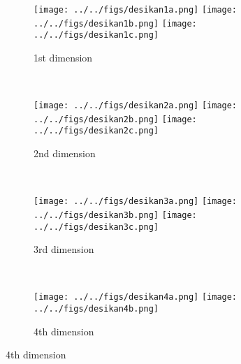 \documentclass[simplex.tex]{subfiles}
\begin{document}
\begin{figure}	
\centering
\begin{subfigure}[t]{0.6\textwidth}
\caption{1st dimension}
\vspace*{-15pt}
\begin{center}
  \texttt{[image: ../../figs/desikan1a.png]}\hspace{-20pt}
  \texttt{[image: ../../figs/desikan1b.png]}\hspace{-20pt}
  \texttt{[image: ../../figs/desikan1c.png]}
\end{center}
\end{subfigure}\\
\vspace*{5pt}
\begin{subfigure}[t]{0.6\textwidth}
\caption{2nd dimension}
\vspace*{-15pt}
\begin{center}
  \texttt{[image: ../../figs/desikan2a.png]}\hspace{-20pt}
  \texttt{[image: ../../figs/desikan2b.png]}\hspace{-20pt}
  \texttt{[image: ../../figs/desikan2c.png]}
\end{center}
\end{subfigure}\\
\vspace*{5pt}
\begin{subfigure}[t]{0.6\textwidth}
\caption{3rd dimension}
\vspace*{-15pt}
\begin{center}
  \texttt{[image: ../../figs/desikan3a.png]}\hspace{-20pt}
  \texttt{[image: ../../figs/desikan3b.png]}\hspace{-20pt}
  \texttt{[image: ../../figs/desikan3c.png]}
\end{center}
\end{subfigure}\\
\vspace*{5pt}
\begin{subfigure}[t]{0.6\textwidth}
\caption{4th dimension}
\vspace*{-15pt}
\begin{center}
  \texttt{[image: ../../figs/desikan4a.png]}\hspace{-20pt}
  \texttt{[image: ../../figs/desikan4b.png]}\hspace{-20pt}

\end{center}
\end{subfigure}
\end{figure}
\end{document}
